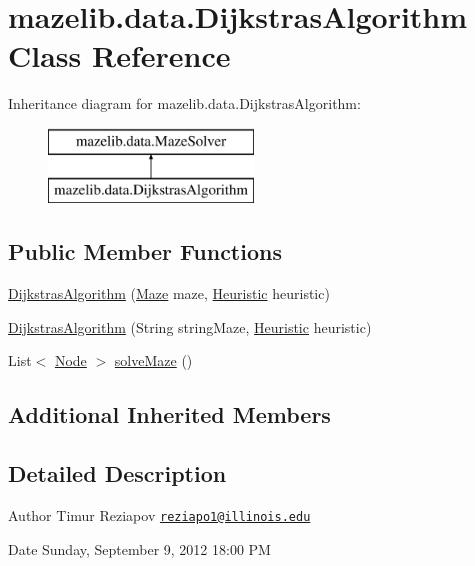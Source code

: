 \hypertarget{classmazelib_1_1data_1_1_dijkstras_algorithm}{\section{mazelib.\-data.\-Dijkstras\-Algorithm Class Reference}
\label{classmazelib_1_1data_1_1_dijkstras_algorithm}
}
Inheritance diagram for mazelib.\-data.\-Dijkstras\-Algorithm\-:\begin{figure}[H]
\begin{center}
\leavevmode
\includegraphics[height=2.000000cm]{classmazelib_1_1data_1_1_dijkstras_algorithm}
\end{center}
\end{figure}
\subsection*{Public Member Functions}
\begin{DoxyCompactItemize}
\item 
\hyperlink{classmazelib_1_1data_1_1_dijkstras_algorithm_ade11d276ab1b7c542eb6860c483924d2}{Dijkstras\-Algorithm} (\hyperlink{classmazelib_1_1data_1_1_maze}{Maze} maze, \hyperlink{interfacemazelib_1_1data_1_1_heuristic}{Heuristic} heuristic)
\item 
\hyperlink{classmazelib_1_1data_1_1_dijkstras_algorithm_ad956882a012e15144eb3339746105497}{Dijkstras\-Algorithm} (String string\-Maze, \hyperlink{interfacemazelib_1_1data_1_1_heuristic}{Heuristic} heuristic)
\item 
List$<$ \hyperlink{classmazelib_1_1data_1_1_node}{Node} $>$ \hyperlink{classmazelib_1_1data_1_1_dijkstras_algorithm_abe1208942d2a0397235aef4737990ca2}{solve\-Maze} ()
\end{DoxyCompactItemize}
\subsection*{Additional Inherited Members}


\subsection{Detailed Description}
\begin{DoxyAuthor}{Author}
Timur Reziapov \href{mailto:reziapo1@illinois.edu}{\tt reziapo1@illinois.\-edu} 
\end{DoxyAuthor}
\begin{DoxyDate}{Date}
Sunday, September 9, 2012 18\-:00 P\-M 
\end{DoxyDate}


